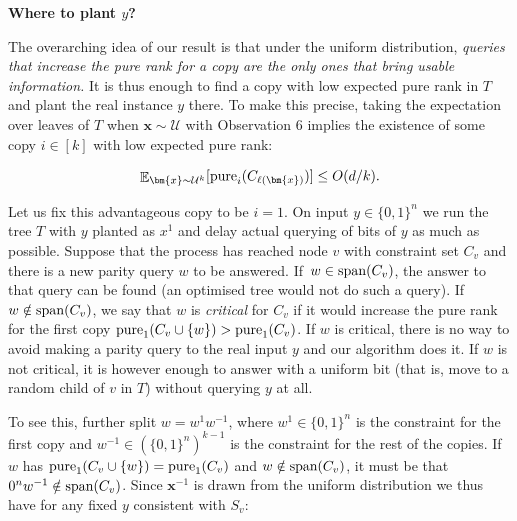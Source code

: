\par\medskip\noindent\textbf{Where to plant $y$?}\par




The overarching idea of our result is that under the uniform distribution, \emph{queries that increase the pure rank for a copy are the only ones that bring usable information.} It is thus enough to find a copy with low expected pure rank in $T$ and plant the real instance $y$ there. To make this precise, taking the expectation over leaves of $T$ when $\bm{x}\sim\mathcal{U}$ with Observation 6 implies the existence of some copy $i\in[k]$ with low expected pure rank:\par


\[\begin{gathered}
\mathop{\mathbb{E}}\nolimits_{\bm{x}\sim\mathcal{U}^{k}}[\mathop{\textup{pure}}\nolimits_{i}(C_{\ell(\bm{x})})]\leq O(d/k).
\end{gathered}\]


Let us fix this advantageous copy to be $i=1$. On input $y\in\{0,1\}^{n}$ we run the tree $T$ with $y$ planted as $x^{1}$ and delay actual querying of bits of $y$ as much as possible. Suppose that the process has reached node $v$ with constraint set $C_{v}$ and there is a new parity query $w$ to be answered. If $w\in\textup{span}(C_{v})$, the answer to that query can be found (an optimised tree would not do such a query). If $w\notin\textup{span}(C_{v})$, we say that $w$ is \emph{critical} for $C_{v}$ if it would increase the pure rank for the first copy $\mathop{\textup{pure}}_{1}(C_{v}\cup\{w\})>\mathop{\textup{pure}}_{1}(C_{v})$. If $w$ is critical, there is no way to avoid making a parity query to the real input $y$ and our algorithm does it. If $w$ is not critical, it is however enough to answer with a uniform bit (that is, move to a random child of $v$ in $T$) without querying $y$ at all.\par




To see this, further split $w=w^{1}w^{-1}$, where $w^{1}\in\{0,1\}^{n}$ is the constraint for the first copy and $w^{-1}\in(\{0,1\}^{n})^{k-1}$ is the constraint for the rest of the copies. If $w$ has $\mathop{\textup{pure}}_{1}(C_{v}\cup\{w\})=\mathop{\textup{pure}}_{1}(C_{v})$ and $w\notin\textup{span}(C_{v})$, it must be that $0^{n}w^{-1}\notin\textup{span}(C_{v})$. Since $\bm{x}^{-1}$ is drawn from the uniform distribution we thus have for any fixed $y$ consistent with $S_{v}$:\par


